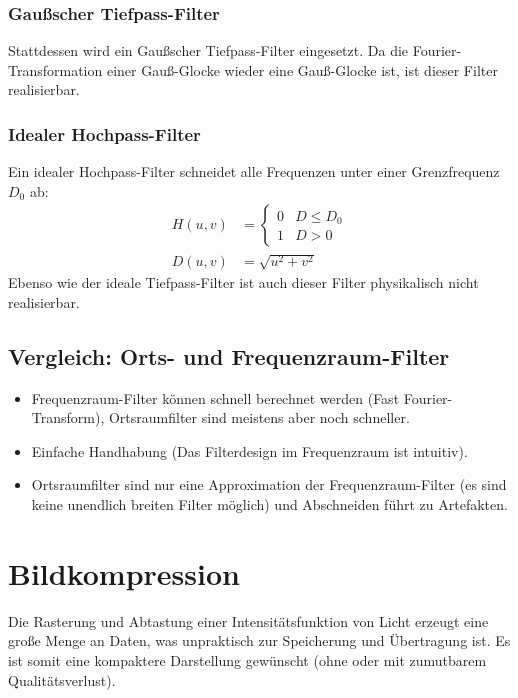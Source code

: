 \documentclass[a4paper, 11pt, accentcolor = tud3b]{tudreport}
\begin{document}
				\subsubsection{Gaußscher Tiefpass-Filter}
					Stattdessen wird ein Gaußscher Tiefpass-Filter eingesetzt. Da die Fourier-Transformation einer Gauß-Glocke wieder eine Gauß-Glocke ist, ist dieser Filter realisierbar.

				\subsubsection{Idealer Hochpass-Filter}
					Ein idealer Hochpass-Filter schneidet alle Frequenzen unter einer Grenzfrequenz \( D_0 \) ab:
					\begin{align*}
						H(u, v) &=
							\begin{cases}
								0 & D \leq D_0 \\
								1 & D > 0
							\end{cases} \\
						D(u, v) &= \sqrt{u^2 + v^2}
					\end{align*}
					Ebenso wie der ideale Tiefpass-Filter ist auch dieser Filter physikalisch nicht realisierbar.

			\subsection{Vergleich: Orts- und Frequenzraum-Filter}
				\begin{itemize}
					\item Frequenzraum-Filter können schnell berechnet werden (Fast Fourier-Transform), Ortsraumfilter sind meistens aber noch schneller.
					\item Einfache Handhabung (Das Filterdesign im Frequenzraum ist intuitiv).
					\item Ortsraumfilter sind nur eine Approximation der Frequenzraum-Filter (es sind keine unendlich breiten Filter möglich) und Abschneiden führt zu Artefakten.
				\end{itemize}

		\section{Bildkompression}
			Die Rasterung und Abtastung einer Intensitätsfunktion von Licht erzeugt eine große Menge an Daten, was unpraktisch zur Speicherung und Übertragung ist. Es ist somit eine kompaktere Darstellung gewünscht (ohne oder mit zumutbarem Qualitätsverlust).
			
\end{document}
